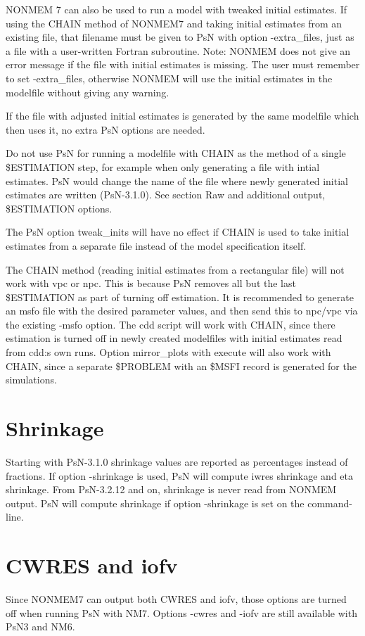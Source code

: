\documentclass[a4paper,12pt]{article}
\begin{document}
NONMEM 7 can also be used to run a model with tweaked initial estimates. If using the CHAIN method of NONMEM7 and taking initial estimates from an existing file, that filename must be given to PsN with option -extra\_files, just as a file with a user-written Fortran subroutine. Note: NONMEM does not give an error message if the file with initial estimates is missing. The user must remember to set -extra\_files, otherwise NONMEM will use the initial estimates in the modelfile without giving any warning.

If the file with adjusted initial estimates is generated by the same modelfile which then uses it, no extra PsN options are needed.

Do not use PsN for running a modelfile with CHAIN as the method of a single \$ESTIMATION step, for example when only generating a file with intial estimates. PsN would change the name of the file where newly generated initial estimates are written (PsN-3.1.0). See section Raw and additional output, \$ESTIMATION options.

The PsN option tweak\_inits will have no effect if CHAIN is used to take initial estimates from a separate file instead of the model specification itself.

The CHAIN method (reading initial estimates from a rectangular file) will not work with vpc or npc. This is because PsN removes all but the last \$ESTIMATION as part of turning off estimation. It is recommended to generate an msfo file with the desired parameter values, and then send this to npc/vpc via the existing -msfo option. The cdd script will work with CHAIN, since there estimation is turned off in newly created modelfiles with initial estimates read from cdd:s own runs. Option mirror\_plots with execute will also work with CHAIN, since a separate \$PROBLEM with an \$MSFI record is generated for the simulations.

\section{Shrinkage}

Starting with PsN-3.1.0 shrinkage values are reported as percentages instead of fractions. If option -shrinkage is used, PsN will compute iwres shrinkage and eta shrinkage. From PsN-3.2.12 and on, shrinkage is never read from NONMEM output. PsN will compute shrinkage if option -shrinkage is set on the command-line.

\section{CWRES and iofv}

Since NONMEM7 can output both CWRES and iofv, those options are turned off when running PsN with NM7. Options -cwres and -iofv are still available with PsN3 and NM6.
\end{document}
